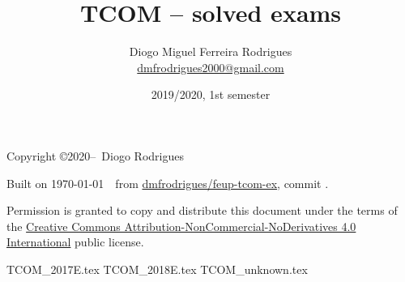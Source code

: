 \documentclass{tcom}
\title{TCOM -- solved exams}
\author{Diogo Miguel Ferreira Rodrigues \\ \href{mailto:dmfrodrigues2000@gmail.com}{dmfrodrigues2000@gmail.com}}
\date{2019/2020, 1st semester}
\begin{document}
\maketitle
\begin{secondpage}
    Copyright \copyright 2020--\the\year\ Diogo Rodrigues\par
    \par
    \immediate{}
    Built on \today~\currenttime~from \href{https://github.com/dmfrodrigues/feup-tcom-ex}{dmfrodrigues/feup-tcom-ex}, commit \unskip.\par
    Permission is granted to copy and distribute this document under the terms of the
    \href{https://creativecommons.org/licenses/by-nc-nd/4.0/}{Creative Commons Attribution-NonCommercial-NoDerivatives 4.0 International}
    public license.
\end{secondpage}
\frontmatter
\tableofcontents
\mainmatter
{TCOM_2017E.tex}
{TCOM_2018E.tex}
{TCOM_unknown.tex}
\end{document}
